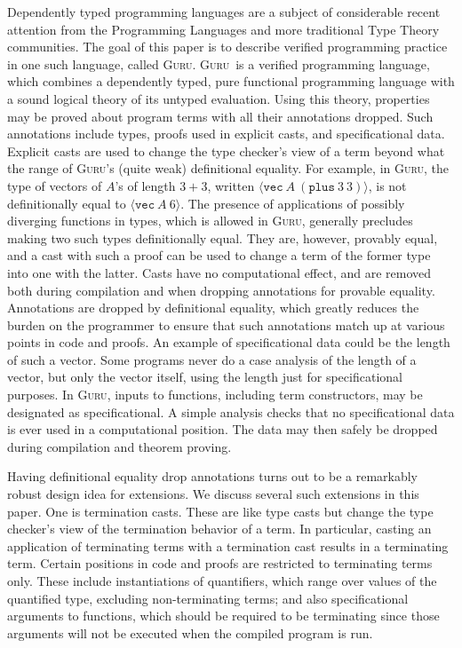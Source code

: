 \documentclass[preprint,natbib]{sigplanconf}
\newcommand{\guru}[0]{\textsc{Guru}}
\begin{document}
Dependently typed programming languages are a subject of considerable
recent attention from the Programming Languages and more traditional
Type Theory communities.  The goal of this paper is to describe
verified programming practice in one such language, called \guru.
\guru\ is a verified programming language, which combines a
dependently typed, pure functional programming language with a sound
logical theory of its untyped evaluation.  Using this theory,
properties may be proved about program terms with all their
annotations dropped.  Such annotations include types, proofs used in
explicit casts, and specificational data.  Explicit casts are used to
change the type checker's view of a term beyond what the range of
\guru's (quite weak) definitional equality.  For example, in \guru,
the type of vectors of $A$'s of length $3+3$, written $\langle
\texttt{vec}\ A\ (\texttt{plus}\ 3\ 3)\rangle$, is not definitionally
equal to $\langle \texttt{vec}\ A\ 6\rangle$.  The presence of
applications of possibly diverging functions in types, which is
allowed in \guru, generally precludes making two such types
definitionally equal.  They are, however, provably equal, and a cast
with such a proof can be used to change a term of the former type into
one with the latter.  Casts have no computational effect, and are
removed both during compilation and when dropping annotations for
provable equality.  Annotations are dropped by definitional equality,
which greatly reduces the burden on the programmer to ensure that such
annotations match up at various points in code and proofs.  An example
of specificational data could be the length of such a vector.  Some
programs never do a case analysis of the length of a vector, but only
the vector itself, using the length just for specificational purposes.
In \guru, inputs to functions, including term constructors, may be
designated as specificational.  A simple analysis checks that no
specificational data is ever used in a computational position.  The
data may then safely be dropped during compilation and theorem
proving.

Having definitional equality drop annotations turns out to be a
remarkably robust design idea for extensions.  We discuss several such
extensions in this paper.  One is termination casts.  These are like
type casts but change the type checker's view of the termination
behavior of a term.  In particular, casting an application of
terminating terms with a termination cast results in a terminating
term.  Certain positions in code and proofs are restricted to
terminating terms only.  These include instantiations of quantifiers,
which range over values of the quantified type, excluding
non-terminating terms; and also specificational arguments to
functions, which should be required to be terminating since those
arguments will not be executed when the compiled program is run.
\end{document}
